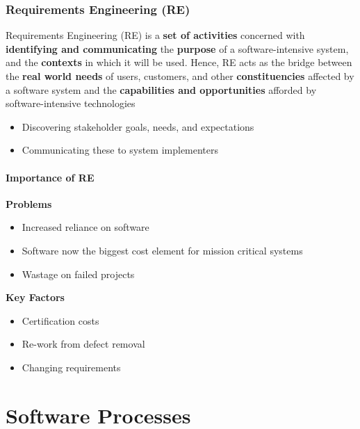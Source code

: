 \documentclass{report}
\begin{document}
\subsection{Requirements Engineering (RE)}
Requirements Engineering (RE) is a \textbf{set of activities} concerned with \textbf{identifying and communicating} the \textbf{purpose} of a software-intensive system, and the \textbf{contexts} in which it will be used. Hence, RE acts as the bridge between the \textbf{real world needs} of users, customers, and other \textbf{constituencies} affected by a software system and the \textbf{capabilities and opportunities} afforded by software-intensive technologies
\begin{itemize}
  \item Discovering stakeholder goals, needs, and expectations
  \item Communicating these to system implementers
\end{itemize}

\subsubsection{Importance of RE}
\textbf{Problems}
\begin{itemize}
  \item Increased reliance on software
  \item Software now the biggest cost element for mission critical systems
  \item Wastage on failed projects
\end{itemize}
\textbf{Key Factors}
\begin{itemize}
  \item Certification costs
  \item Re-work from defect removal
  \item Changing requirements
\end{itemize}

\newpage
\chapter{Software Processes}
\end{document}
